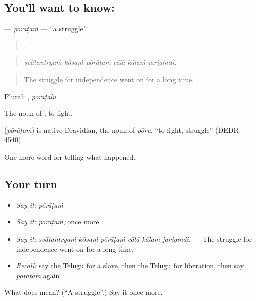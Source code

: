 \subsection*{You'll want to know: }
\textbf{} — \emph{pōrāṭaṁ} — \textquotedblleft{}a struggle\textquotedblright{}.

\begin{quote}
     .
\end{quote}

\begin{quote}
\emph{svātantryaṁ kōsaṁ pōrāṭaṁ cālā kālaṁ jarigindi.}
\end{quote}

\begin{quote}
The struggle for independence went on for a long time.
\end{quote}

Plural: , \emph{pōrāṭālu}.

The noun of , to fight.

\begin{cousinweb}
\textbf{} (\emph{pōrāṭaṁ}) is native Dravidian, the noun of \emph{pōru}, \textquotedblleft{}to fight, struggle\textquotedblright{} (DEDR 4540).
\end{cousinweb}

\begin{grammarlens}[title={What you've built}]
One more word for telling what happened.
\end{grammarlens}

\subsection*{Your turn}
\begin{itemize}
\raggedright
  \item \emph{Say it:} \emph{pōrāṭaṁ}
  \item \emph{Say it:} \emph{pōrāṭaṁ}, once more
  \item \emph{Say it:} \emph{svātantryaṁ kōsaṁ pōrāṭaṁ cālā kālaṁ jarigindi.} — The struggle for independence went on for a long time.
  \item \emph{Recall:} say the Telugu for a slave, then the Telugu for liberation, then say \emph{pōrāṭaṁ} again
\end{itemize}

\begin{tcolorbox}[breakable,colback=teal!4,colframe=teal!35!black,title={Before you move on}]
What does  mean? (\textquotedblleft{}A struggle\textquotedblright{}.) Say it once more.
\end{tcolorbox}
